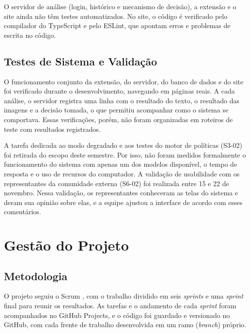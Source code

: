 \documentclass[
    12pt,           %
    oneside,        %
    a4paper,        %
    chapter=TITLE,  %
    english,        %
    brazil          %
]{abntex2}
\begin{document}
O servidor de análise (login, histórico e mecanismo de decisão), a extensão e
o site ainda não têm testes automatizados. No site, o código é verificado pelo
compilador do TypeScript e pelo ESLint, que apontam erros e problemas de
escrita no código.
\section{Testes de Sistema e Validação}

O funcionamento conjunto da extensão, do servidor, do banco de dados e do site
foi verificado durante o desenvolvimento, navegando em páginas reais. A cada
análise, o servidor registra uma linha com o resultado do texto, o resultado
das imagens e a decisão tomada, o que permitiu acompanhar como o sistema se
comportava. Essas verificações, porém, não foram organizadas em roteiros de
teste com resultados registrados.

A tarefa dedicada ao modo degradado e aos testes do motor de políticas
(S3-02) foi retirada do escopo deste semestre. Por isso, não foram medidos
formalmente o funcionamento do sistema com apenas um dos modelos disponível,
o tempo de resposta e o uso de recursos do computador. A validação de
usabilidade com os representantes da comunidade externa (S6-02) foi realizada
entre 15 e 22 de novembro.
Nessa validação, os representantes conheceram as telas do sistema e deram
sua opinião sobre elas, e a equipe ajustou a interface de acordo com esses
comentários.
\chapter{Gestão do Projeto}

\section{Metodologia}

O projeto seguiu o Scrum \cite{scrumguide2020}, com o trabalho dividido em
seis \textit{sprints} e uma \textit{sprint} final para reunir os resultados.
As tarefas e o andamento de cada \textit{sprint} foram acompanhados no GitHub
Projects, e o código foi guardado e versionado no GitHub, com cada frente de
trabalho desenvolvida em um ramo (\textit{branch}) próprio.
\end{document}
